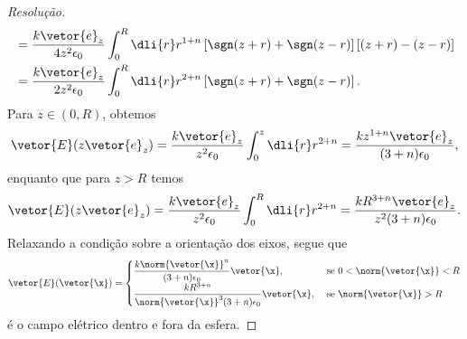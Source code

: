\begin{proof}[Resolução]
\begin{align*}
                                &= \frac{k \vetor{e}_z}{4z^2 \epsilon_0} \int_0^R \dli{r} r^{1+n}\left[\sgn(z+r) + \sgn(z-r)\right]\left[(z + r) - (z - r)\right]\\
                                &= \frac{k \vetor{e}_z}{2z^2 \epsilon_0} \int_0^R \dli{r} r^{2+n}\left[\sgn(z+r) + \sgn(z-r)\right].
    \end{align*}
    Para \(z \in (0, R)\), obtemos
    \begin{align*}
        \vetor{E}(z\vetor{e}_z) = \frac{k \vetor{e}_z}{z^2 \epsilon_0} \int_0^z \dli{r} r^{2+n} = \frac{kz^{1+n} \vetor{e}_z}{(3+n) \epsilon_0},
    \end{align*}
    enquanto que para \(z > R\) temos
    \begin{align*}
        \vetor{E}(z\vetor{e}_z) = \frac{k \vetor{e}_z}{z^2 \epsilon_0} \int_0^R \dli{r} r^{2+n} = \frac{k R^{3+n}\vetor{e}_z}{z^2(3+n) \epsilon_0}.
    \end{align*}
    Relaxando a condição sobre a orientação dos eixos, segue que
    \begin{equation*}
        \vetor{E}(\vetor{\x}) = \begin{cases}
            \dfrac{k\norm{\vetor{\x}}^{n}}{(3+n)\epsilon_0}\vetor{\x}, &\text{ se }0 < \norm{\vetor{\x}} < R\\
            \dfrac{kR^{3+n}}{\norm{\vetor{\x}}^3(3+n)\epsilon_0}\vetor{\x}, &\text{ se }\norm{\vetor{\x}} > R
        \end{cases}
    \end{equation*}
    é o campo elétrico dentro e fora da esfera.
\end{proof}
